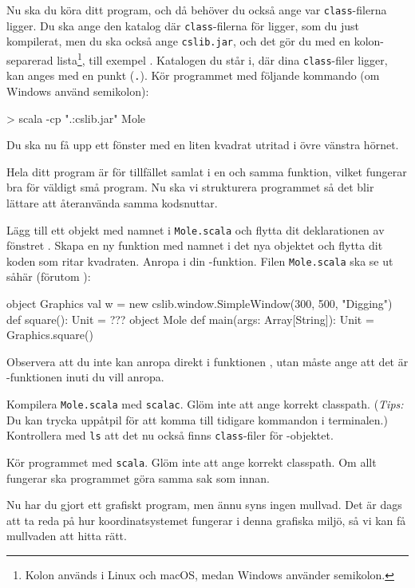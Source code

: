 \Subtask
Nu ska du köra ditt program, och då behöver du också ange var \texttt{class}-filerna ligger.
Du ska ange den katalog där \texttt{class}-filerna för  ligger, som du just kompilerat, men du ska också ange \texttt{cslib.jar}, och det gör du med en kolon-separerad lista\footnote{Kolon används i Linux och macOS, medan Windows använder semikolon.}, till exempel .
Katalogen du står i, där dina \texttt{class}-filer ligger, kan anges med en punkt (\texttt{.}).
Kör programmet med följande kommando (om Windows använd semikolon):
\begin{REPLnonum}
> scala -cp ".:cslib.jar" Mole
\end{REPLnonum}
Du ska nu få upp ett fönster med en liten kvadrat utritad i övre vänstra hörnet.


\Task
Hela ditt program är för tillfället samlat i en och samma funktion, vilket fungerar bra för väldigt små program.
Nu ska vi strukturera programmet så det blir lättare att återanvända samma kodsnuttar.

\Subtask
Lägg till ett objekt med namnet  i \texttt{Mole.scala} och flytta dit deklarationen av fönstret .
Skapa en ny funktion med namnet  i det nya objektet och flytta dit koden som ritar kvadraten.
Anropa  i din -funktion.
Filen \texttt{Mole.scala} ska se ut såhär (förutom ):
\begin{Code}
object Graphics {
	val w = new cslib.window.SimpleWindow(300, 500, "Digging")
	def square(): Unit = ???
}
object Mole {
	def main(args: Array[String]): Unit = {
		Graphics.square()
	}
}
\end{Code}
Observera att du inte kan anropa  direkt i funktionen , utan måste ange att det är -funktionen inuti  du vill anropa.

\Subtask
Kompilera \texttt{Mole.scala} med \texttt{scalac}.
Glöm inte att ange korrekt classpath.
(\emph{Tips:} Du kan trycka uppåtpil för att komma till tidigare kommandon i terminalen.)
Kontrollera med \texttt{ls} att det nu också finns \texttt{class}-filer för -objektet.

\Subtask
Kör programmet  med \texttt{scala}.
Glöm inte att ange korrekt classpath.
Om allt fungerar ska programmet göra samma sak som innan.

\Task
Nu har du gjort ett grafiskt program, men ännu syns ingen mullvad.
Det är dags att ta reda på hur koordinatsystemet fungerar i denna grafiska miljö, så vi kan få mullvaden att hitta rätt.


